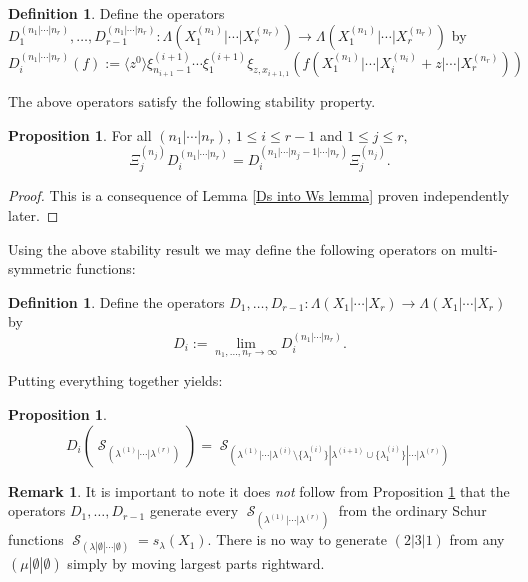 \documentclass[12pt,reqno]{amsart}
\theoremstyle{definition}
\newtheorem{prop}[thm]{Proposition}
\newtheorem{defn}[thm]{Definition}
\newtheorem{remark}{Remark}
\DeclareMathOperator{\cS}{\mathcal{S}}
\begin{document}
\begin{defn}\label{defn of finite var Ds}
    Define the operators $D_1^{(n_1|\cdots|n_r)},\ldots,D_{r-1}^{(n_{1}|\cdots | n_r)}: \Lambda(X_{1}^{(n_1)}|\cdots|X_{r}^{(n_r)}) \rightarrow \Lambda(X_{1}^{(n_1)}|\cdots|X_{r}^{(n_r)})$ by 
    $$D_{i}^{(n_1|\cdots|n_r)}(f):= \langle z^0 \rangle\xi^{(i+1)}_{n_{i+1}-1}\cdots \xi^{(i+1)}_{1} \xi_{z,x_{i+1,1}}\left( f (X_1^{(n_1)}|\cdots| X_{i}^{(n_i)}+z|\cdots |X_r^{(n_r)}) \right)$$
\end{defn}


The above operators satisfy the following stability property.

\begin{prop}
    For all $(n_1|\cdots|n_r)$, $1\leq i \leq r-1$ and $1 \leq j \leq r,$
    $$\Xi_{j}^{(n_j)}D_{i}^{(n_1|\cdots|n_r)}  = D_i^{(n_1|\cdots|n_j-1|\cdots|n_r)}\Xi_{j}^{(n_j)}.$$ 
\end{prop}
\begin{proof}
    This is a consequence of Lemma \ref{Ds into Ws lemma} proven independently later.
\end{proof}


Using the above stability result we may define the following operators on multi-symmetric functions:


\begin{defn}
    Define the operators $D_1,\ldots,D_{r-1}: \Lambda(X_1|\cdots|X_r)\rightarrow \Lambda(X_1|\cdots|X_r) $ by 
    $$D_i := \lim_{n_1,\ldots,n_r \rightarrow \infty} D_{i}^{(n_1|\cdots|n_r)}.$$
\end{defn}

Putting everything together yields:

\begin{prop}\label{recurrence prop}
    $$D_i\left(\cS_{(\lambda^{(1)}|\cdots |\lambda^{(r)})} \right) = \cS_{(\lambda^{(1)}|\cdots|\lambda^{(i)}\setminus \{\lambda^{(i)}_{1}\}|\lambda^{(i+1)} \cup \{\lambda^{(i)}_{1}\}|\cdots |\lambda^{(r)})}$$
\end{prop}

\begin{remark}
    It is important to note it does \textit{not} follow from Proposition \ref{recurrence prop} that the operators $D_1,\ldots,D_{r-1}$ generate every $\cS_{(\lambda^{(1)}|\cdots | \lambda^{(r)})}$ from the ordinary Schur functions $\cS_{(\lambda|\emptyset|\cdots |\emptyset)} = s_{\lambda}(X_1)$. There is no way to generate $(2|3|1)$ from any $(\mu|\emptyset| \emptyset)$ simply by moving largest parts rightward. 
\end{remark}
\end{document}
